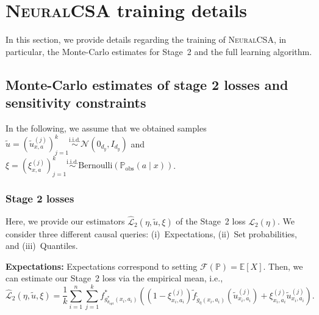 \documentclass{article} %
\newcommand{\frameworkname}{\textsc{NeuralCSA}\xspace}
\theoremstyle{definition}
\theoremstyle{plain}
\begin{document}
\clearpage

\section{\frameworkname training details }\label{app:learning_alg}

In this section, we provide details regarding the training of \frameworkname, in particular, the Monte-Carlo estimates for Stage~2 and the full learning algorithm.

\subsection{Monte-Carlo estimates of stage 2 losses and sensitivity constraints}

In the following, we assume that we obtained samples $\widetilde{u} = (\widetilde{u}^{(j)}_{x, a})_{j=1}^k \overset{\text{i.i.d.}}{\sim} \mathcal{N}(0_{d_y}, I_{d_y})$ and $\xi = (\xi^{(j)}_{x, a})_{j=1}^k \overset{\text{i.i.d.}}{\sim} \mathrm{Bernoulli}(\mathbb{P}_\mathrm{obs}(a \mid x))$.  

\subsubsection{Stage 2 losses}

Here, we provide our estimators $\hat{\mathcal{L}}_2(\eta, \widetilde{u}, \xi)$ of the Stage~2 loss $\mathcal{L}_2(\eta)$. We consider three different causal queries: (i)~Expectations, (ii)~Set probabilities, and (iii)~Quantiles.

\textbf{Expectations:} Expectations correspond to setting $\mathcal{F}(\mathbb{P}) = \mathbb{E}[X]$. Then, we can estimate our Stage~2 loss via the empirical mean, i.e.,
\begin{equation}
    \hat{\mathcal{L}}_2(\eta, \widetilde{u}, \xi) = \frac{1}{k}  \sum_{i=1}^n \sum_{j=1}^k f^\ast_{g^\ast_{\theta_\mathrm{opt}}(x_i, a_i)}\left( (1 - \xi_{x_i, a_i}^{(j)}) \widetilde{f}_{\widetilde{g}_\eta(x_i, a_i)}(\widetilde{u}_{x_i, a_i}^{(j)}) +  \xi_{x_i, a_i}^{(j)} \widetilde{u}_{x_i, a_i}^{(j)}\right).
\end{equation}
\end{document}
